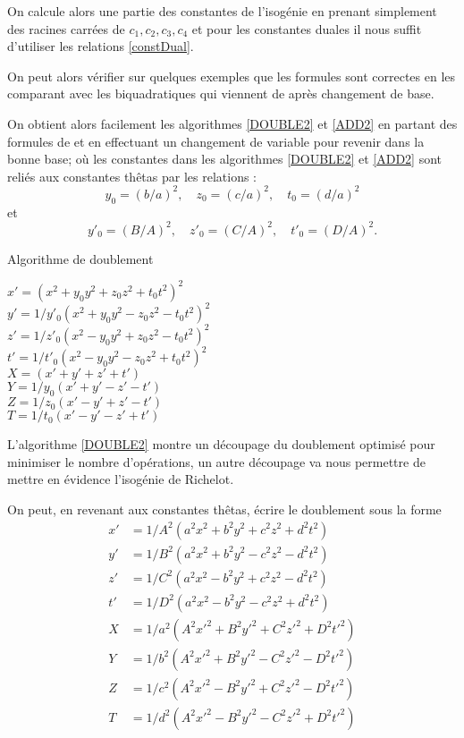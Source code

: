 \documentclass[a4paper,12pt]{article}
\theoremstyle{definition}
\theoremstyle{remark}
\numberwithin{equation}{section}
\begin{document}
On calcule alors une partie des constantes de l'isogénie en prenant simplement des racines carrées de $c_1,c_2,c_3,c_4$ et pour les constantes duales il nous suffit d'utiliser les relations \ref{constDual}.

On peut alors vérifier sur quelques exemples que les formules sont correctes en les comparant avec les biquadratiques qui viennent de \citep{biquad} après changement de base.

On obtient alors facilement les algorithmes \ref{DOUBLE2} et \ref{ADD2} en partant des formules de \citep{gaudry} et en effectuant un changement de variable pour revenir dans la bonne base; où les constantes dans les algorithmes \ref{DOUBLE2} et \ref{ADD2} sont reliés aux constantes thêtas par les relations :
$$y_0 = (b/a)^2, \quad z_0 = (c/a)^2, \quad t_0 = (d/a)^2$$
et
$$y'_0 = (B/A)^2, \quad z'_0 = (C/A)^2, \quad t'_0 = (D/A)^2.$$

\begin{algorithm}
\label{DOUBLE2}
\caption{Algorithme de doublement}
$x' = (x^2 + y_0y^2 + z_0z^2 + t_0t^2)^2$ \\
$y' = 1/y'_0(x^2 + y_0y^2 - z_0z^2 - t_0t^2)^2$ \\
$z' = 1/z'_0(x^2 - y_0y^2 + z_0z^2 - t_0t^2)^2$ \\
$t' = 1/t'_0(x^2 - y_0y^2 - z_0z^2 + t_0t^2)^2$ \\
$X = (x' + y' + z' + t')$ \\
$Y = 1/y_0(x' + y' - z' - t')$ \\
$Z = 1/z_0(x' - y' + z' - t')$ \\
$T = 1/t_0(x' - y' - z' + t')$ \\
\end{algorithm}

L'algorithme \ref{DOUBLE2} montre un découpage du doublement optimisé pour minimiser le nombre d'opérations, un autre découpage va nous permettre de mettre en évidence l'isogénie de Richelot.

On peut, en revenant aux constantes thêtas, écrire le doublement sous la forme
\begin{align*}
x' &= 1/A^2(a^2x^2 + b^2y^2 + c^2z^2 + d^2t^2) \\
y' &= 1/B^2(a^2x^2 + b^2y^2 - c^2z^2 - d^2t^2) \\
z' &= 1/C^2(a^2x^2 - b^2y^2 + c^2z^2 - d^2t^2) \\
t' &= 1/D^2(a^2x^2 - b^2y^2 - c^2z^2 + d^2t^2) \\
X &= 1/a^2(A^2x'^2 + B^2y'^2 + C^2z'^2 + D^2t'^2) \\
Y &= 1/b^2(A^2x'^2 + B^2y'^2 - C^2z'^2 - D^2t'^2) \\
Z &= 1/c^2(A^2x'^2 - B^2y'^2 + C^2z'^2 - D^2t'^2) \\
T &= 1/d^2(A^2x'^2 - B^2y'^2 - C^2z'^2 + D^2t'^2) \\
\end{align*}
\end{document}
